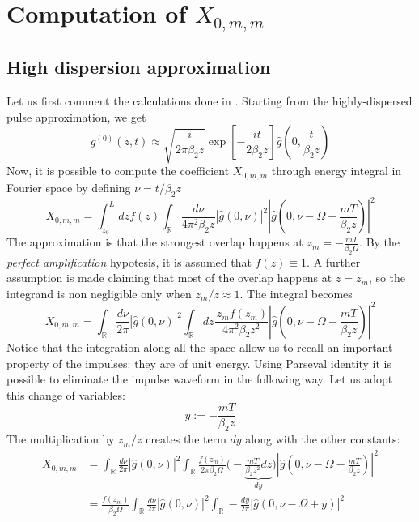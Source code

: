 \documentclass[10pt, lettersize, journal, onecolumn]{IEEEtran}
\begin{document}
\section{Computation of $X_{0, m, m}$} \label{approx}
	\subsection{High dispersion approximation}
Let us first comment the calculations done in \cite[eq. 11, 12]{Dar_2013}. Starting from the highly-dispersed pulse approximation, we get
\begin{equation}\label{eq:papoulis}
	g^{(0)}(z, t) \approx \sqrt{\frac{i}{2\pi \beta_2 z}} \exp\left[-\frac{it}{2 \beta_2 z}\right] \hat{g}\left(0, \frac{t}{\beta_2 z}\right)	
\end{equation}
Now, it is possible to compute the coefficient $X_{0, m, m}$ through energy integral in Fourier space by defining $\nu = t/\beta_2 z$
\begin{equation}
	X_{0, m, m} = \int_{z_0}^{L} dz f(z) \int_{\mathbb{R}} \frac{d\nu}{4\pi^2 \beta_2 z} |\hat{g}(0, \nu)|^2 \left|\hat{g}\left(0, \nu-\Omega-\frac{mT}{\beta_2 z}\right)\right|^2
\end{equation}
The approximation is that the strongest overlap happens at $z_m = -\frac{mT}{\beta_2 \Omega}$.
By the \textit{perfect amplification} hypotesis, it is assumed that $f(z) \equiv 1$. A further assumption is made claiming that most of the overlap happens at $z=z_m$, so the integrand is non negligible only when $z_m/z \approx 1$. 
The integral becomes
\begin{equation}
	X_{0, m, m} = \int_{\mathbb{R}} \frac{d\nu}{2\pi}  |\hat{g}(0, \nu)|^2 \int_{\mathbb{R}} dz\frac{\, z_m f(z_m)}{4\pi^2 \beta_2 z^2}\left|\hat{g}\left(0, \nu-\Omega-\frac{mT}{\beta_2 z}\right)\right|^2
\end{equation}
Notice that the integration along all the space allow us to recall an important property of the impulses: they are of unit energy. Using Parseval identity it is possible to eliminate the impulse waveform in the following way.
Let us adopt this change of variables:
\begin{equation}
	y:= -\frac{mT}{\beta_2 z} 
\end{equation}
The multiplication by $z_m/z$ creates the term $dy$ along with the other constants:
\begin{align}
	X_{0, m, m} &= \int_{\mathbb{R}} \frac{d\nu}{2\pi}  |\hat{g}(0, \nu)|^2 \int_{\mathbb{R}} \frac{f(z_m)}{2\pi \beta_2 \Omega}  \Big(-\underbrace{\frac{mT}{\beta_2 z^2} dz}_{dy}\Big) \left|\hat{g}\left(0, \nu-\Omega-\frac{mT}{\beta_2 z}\right)\right|^2 \\
	&=  \frac{f(z_m)}{ \beta_2 \Omega}\int_{\mathbb{R}} \frac{d\nu}{2\pi}  |\hat{g}(0, \nu)|^2 \int_{\mathbb{R}} - \frac{dy}{2\pi} \left|\hat{g}\left(0, \nu-\Omega + y \right)\right|^2
\end{align}
\end{document}
